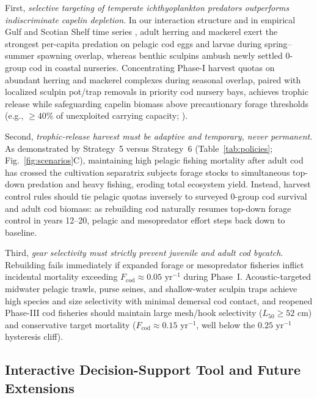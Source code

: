 \documentclass[11pt,letterpaper]{article}
\begin{document}
First, \emph{selective targeting of temperate ichthyoplankton predators outperforms indiscriminate capelin depletion}. In our interaction structure and in empirical Gulf and Scotian Shelf time series \citep{swain2000pelagic}, adult herring and mackerel exert the strongest per-capita predation on pelagic cod eggs and larvae during spring--summer spawning overlap, whereas benthic sculpins ambush newly settled $0$-group cod in coastal nurseries. Concentrating Phase-I harvest quotas on abundant herring and mackerel complexes during seasonal overlap, paired with localized sculpin pot/trap removals in priority cod nursery bays, achieves trophic release while safeguarding capelin biomass above precautionary forage thresholds (e.g., $\ge 40\%$ of unexploited carrying capacity; \citealt{pikitch2012little}).

Second, \emph{trophic-release harvest must be adaptive and temporary, never permanent}. As demonstrated by Strategy~5 versus Strategy~6 (Table~\ref{tab:policies}; Fig.~\ref{fig:scenarios}C), maintaining high pelagic fishing mortality after adult cod has crossed the cultivation separatrix subjects forage stocks to simultaneous top-down predation and heavy fishing, eroding total ecosystem yield. Instead, harvest control rules should tie pelagic quotas inversely to surveyed $0$-group cod survival and adult cod biomass: as rebuilding cod naturally resumes top-down forage control in years 12--20, pelagic and mesopredator effort steps back down to baseline.

Third, \emph{gear selectivity must strictly prevent juvenile and adult cod bycatch}. Rebuilding fails immediately if expanded forage or mesopredator fisheries inflict incidental mortality exceeding $F_{\mathrm{cod}} \approx 0.05\text{ yr}^{-1}$ during Phase~I. Acoustic-targeted midwater pelagic trawls, purse seines, and shallow-water sculpin traps achieve high species and size selectivity with minimal demersal cod contact, and reopened Phase-III cod fisheries should maintain large mesh/hook selectivity ($L_{50} \ge 52\text{ cm}$) and conservative target mortality ($F_{\mathrm{cod}} \approx 0.15\text{ yr}^{-1}$, well below the $0.25\text{ yr}^{-1}$ hysteresis cliff).

\subsection{Interactive Decision-Support Tool and Future Extensions}
\end{document}
